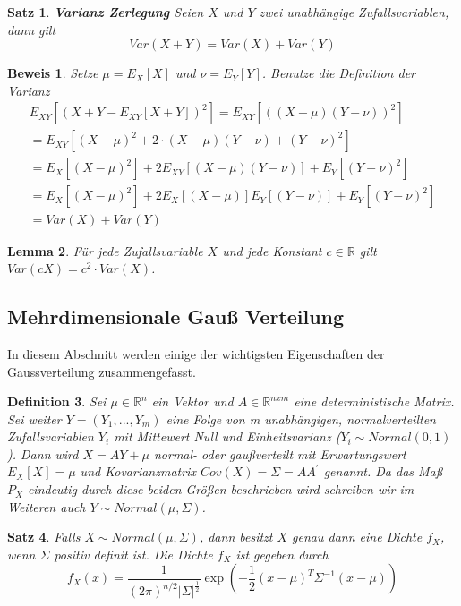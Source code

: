 \documentclass[12pt,a4paper]{scrartcl}
\newtheorem{Satz}{Satz}[section]
\newtheorem{Definition}[Satz]{Definition}
\newtheorem{Lemma}[Satz]{Lemma}
\newtheorem{Beweis}{Beweis}
\numberwithin{equation}{section}
\newcommand{\R}{\mathbb{R}} %
\begin{document}
{  \begin{Satz}\textbf{Varianz Zerlegung}
   Seien $X$ und $Y$ zwei unabhängige Zufallsvariablen, dann gilt 
   $$
   Var(X + Y) = Var(X) + Var(Y)
   $$
  \end{Satz}
  \begin{Beweis}
   Setze $\mu = E_{X}[X]$ und $\nu = E_{Y}[Y]$. Benutze die Definition der Varianz
   $$
   \begin{array}{c}
     E_{XY}[(X+Y-E_{XY}[X+Y])^{2}] = E_{XY}[((X-\mu)(Y-\nu))^{2}] \\
     = E_{XY}[(X-\mu)^{2}+ 2 \cdot (X-\mu)(Y-\nu) + (Y-\nu)^{2}]  \\
     = E_{X}[(X-\mu)^{2}] + 2E_{XY}[(X-\mu)(Y-\nu)] + E_{Y}[(Y-\nu)^{2}] \\
     = E_{X}[(X-\mu)^{2}] + 2E_{X}[(X-\mu)]E_{Y}[(Y-\nu)] + E_{Y}[(Y-\nu)^{2}] \\
     = Var(X) + Var(Y)
   \end{array}
   $$
  \end{Beweis}

  \begin{Lemma}
   Für jede Zufallsvariable $X$ und jede Konstant $c \in \R$ gilt \\ 
   $Var(cX) = c^{2} \cdot Var(X)$.
  \end{Lemma}

\subsection{Mehrdimensionale Gauß Verteilung}

In diesem Abschnitt werden einige der wichtigsten Eigenschaften der Gaussverteilung zusammengefasst.

\begin{Definition} Sei $\mu \in \R^n$ ein Vektor und $A \in \R^{nxm}$ eine deterministische Matrix. 
Sei weiter $ Y = (Y_{1},...,Y_{m})$ eine Folge von m unabhängigen, normalverteilten Zufallsvariablen
$Y_{i}$ mit Mittewert Null und Einheitsvarianz ($Y_{i} \sim Normal(0,1)$). Dann wird $X = AY + \mu$ normal-
oder gaußverteilt mit Erwartungswert $E_{X}[X] = \mu$ und Kovarianzmatrix $Cov(X) = \varSigma = AA^{'}$ genannt.
Da das Maß $P_{X}$ eindeutig durch diese beiden Größen beschrieben wird schreiben wir im Weiteren auch $Y \sim Normal(\mu , \varSigma)$.
\end{Definition}

\begin{Satz} Falls $X \sim Normal(\mu,\varSigma)$, dann besitzt $X$ genau dann eine Dichte $f_X$, wenn 
$\varSigma$ positiv definit ist. Die Dichte $f_{X}$ ist gegeben durch 
\begin{equation}
f_{X}(x) = \frac{1}{(2\pi)^{n/2}|\varSigma|^{\frac{1}{2}}}\exp(-\frac{1}{2}(x-\mu)^{T}\varSigma^{-1}(x-\mu)) 
\end{equation}


\end{Satz}}
\end{document}

